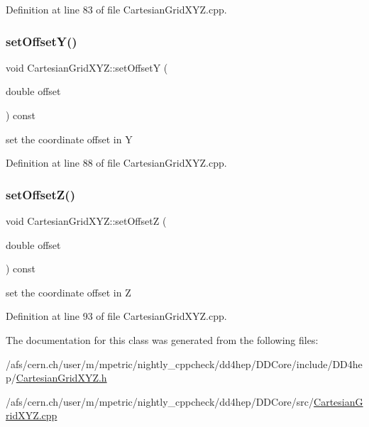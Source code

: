 Definition at line 83 of file Cartesian\+Grid\+X\+Y\+Z.\+cpp.

\hypertarget{class_d_d4hep_1_1_geometry_1_1_cartesian_grid_x_y_z_a48f8934a40c07f1dbfff9be21211da22}{}\label{class_d_d4hep_1_1_geometry_1_1_cartesian_grid_x_y_z_a48f8934a40c07f1dbfff9be21211da22} 
\subsubsection{\texorpdfstring{set\+Offset\+Y()}{setOffsetY()}}
{\footnotesize\ttfamily void Cartesian\+Grid\+X\+Y\+Z\+::set\+OffsetY (\begin{DoxyParamCaption}\item[{double}]{offset }\end{DoxyParamCaption}) const}



set the coordinate offset in Y 



Definition at line 88 of file Cartesian\+Grid\+X\+Y\+Z.\+cpp.

\hypertarget{class_d_d4hep_1_1_geometry_1_1_cartesian_grid_x_y_z_a91df366b3e0ade7feca516c765f1f8dd}{}\label{class_d_d4hep_1_1_geometry_1_1_cartesian_grid_x_y_z_a91df366b3e0ade7feca516c765f1f8dd} 
\subsubsection{\texorpdfstring{set\+Offset\+Z()}{setOffsetZ()}}
{\footnotesize\ttfamily void Cartesian\+Grid\+X\+Y\+Z\+::set\+OffsetZ (\begin{DoxyParamCaption}\item[{double}]{offset }\end{DoxyParamCaption}) const}



set the coordinate offset in Z 



Definition at line 93 of file Cartesian\+Grid\+X\+Y\+Z.\+cpp.



The documentation for this class was generated from the following files\+:\begin{DoxyCompactItemize}
\item 
/afs/cern.\+ch/user/m/mpetric/nightly\+\_\+cppcheck/dd4hep/\+D\+D\+Core/include/\+D\+D4hep/\hyperlink{_d_d_core_2include_2_d_d4hep_2_cartesian_grid_x_y_z_8h}{Cartesian\+Grid\+X\+Y\+Z.\+h}\item 
/afs/cern.\+ch/user/m/mpetric/nightly\+\_\+cppcheck/dd4hep/\+D\+D\+Core/src/\hyperlink{_d_d_core_2src_2_cartesian_grid_x_y_z_8cpp}{Cartesian\+Grid\+X\+Y\+Z.\+cpp}\end{DoxyCompactItemize}
